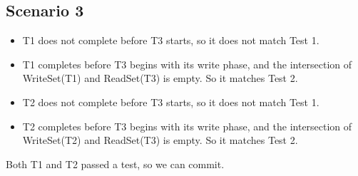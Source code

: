 \documentclass[12pt,a4paper]{article}
\begin{document}
\subsection{Scenario 3}
\begin{itemize}
\item T1 does not complete before T3 starts, so it does not match Test 1.
\item T1 completes before T3 begins with its write phase, and the intersection of WriteSet(T1) and ReadSet(T3) is empty. So it matches Test 2.
\item T2 does not complete before T3 starts, so it does not match Test 1.
\item T2 completes before T3 begins with its write phase, and the intersection of WriteSet(T2) and ReadSet(T3) is empty. So it matches Test 2.
\end{itemize}
Both T1 and T2 passed a test, so we can commit.
\end{document}

